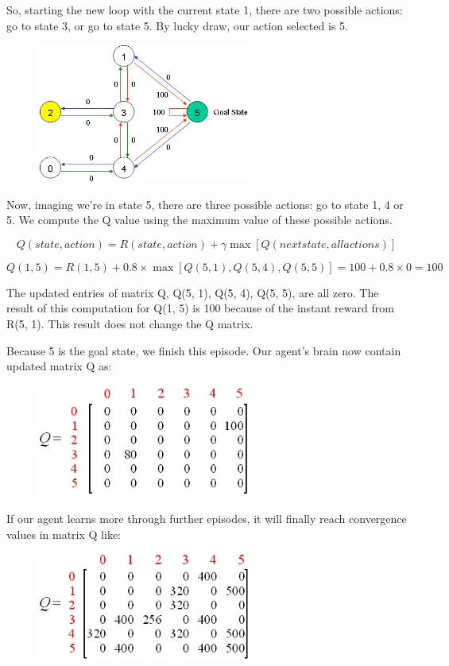 \documentclass[a4paper, 11pt]{article}
\begin{document}
So, starting the new loop with the current state 1, there are two possible actions: go to state 3, or go to state 5.  By lucky draw, our action selected is 5.

\begin{figure}[ht]
\centering
\includegraphics[width=7cm]{Pic/map3a}
\end{figure}

Now, imaging we're in state 5, there are three possible actions: go to state 1, 4 or 5.  We compute the Q value using the maximum value of these possible actions.

$$Q(state, action) = R(state, action) + \gamma\max[Q(next state, all actions)]$$

$$Q(1, 5) = R(1, 5) + 0.8 \times\max[Q(5, 1), Q(5, 4), Q(5, 5)] = 100 + 0.8\times0 = 100$$

The updated entries of matrix Q, Q(5, 1), Q(5, 4), Q(5, 5), are all zero.  The result of this computation for Q(1, 5) is 100 because of the instant reward from R(5, 1).  This result does not change the Q matrix.

Because 5 is the goal state, we finish this episode.  Our agent's brain now contain updated matrix Q as:

\begin{figure}[ht]
\centering
\includegraphics[width=7cm]{Pic/q_matrix3}
\end{figure}

If our agent learns more through further episodes, it will finally reach convergence values in matrix Q like:

\begin{figure}[ht]
\centering
\includegraphics[width=7cm]{Pic/q_matrix4}
\end{figure}
\end{document}
